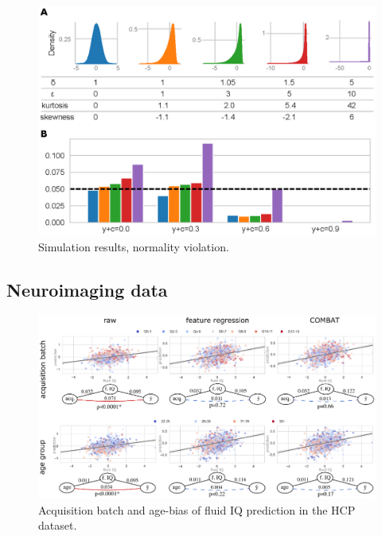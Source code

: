 \documentclass{article}
\begin{document}
\begin{figure}
  \centering
  \includegraphics[width=0.50\paperwidth]{fig/sim_non-norm.eps}
  \caption{Simulation results, normality violation.}
  \label{fig:hcp}
\end{figure}

\subsection{Neuroimaging data}

\begin{figure}
  \centering
  \includegraphics[width=0.75\paperwidth]{fig/fig_hcp.eps}
  \caption{Acquisition batch and age-bias of fluid IQ prediction in the HCP dataset.}
  \label{fig:hcp}
\end{figure}
\end{document}
